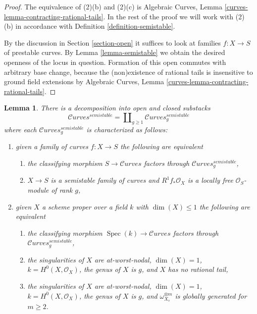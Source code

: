 \documentclass{stacks-project}
\theoremstyle{plain}
\newtheorem{lemma}[subsection]{Lemma}
\theoremstyle{definition}
\theoremstyle{remark}
\numberwithin{equation}{subsection}
\def\Spec{\mathop{\mathrm{Spec}}}
\def\Curvesstack{\mathcal{C}\!\mathit{urves}}
\begin{document}
\begin{proof}
The equivalence of (2)(b) and (2)(c) is
Algebraic Curves, Lemma \ref{curves-lemma-contracting-rational-tails}.
In the rest of the proof we will work with (2)(b)
in accordance with Definition \ref{definition-semistable}.

\medskip\noindent
By the discussion in Section \ref{section-open}
it suffices to look at families $f : X \to S$ of
prestable curves. By Lemma \ref{lemma-semistable}
we obtain the desired openness of the locus in question.
Formation of this open commutes with arbitrary base change,
because the (non)existence of rational tails is insensitive
to ground field extensions by
Algebraic Curves, Lemma \ref{curves-lemma-contracting-rational-tails}.
\end{proof}

\begin{lemma}
\label{lemma-semistable-one-piece-per-genus}
There is a decomposition into open and closed substacks
$$
\Curvesstack^{semistable} = \coprod\nolimits_{g \geq 1}
\Curvesstack^{semistable}_g
$$
where each $\Curvesstack^{semistable}_g$ is characterized as follows:
\begin{enumerate}
\item given a family of curves $f : X \to S$ the following are equivalent
\begin{enumerate}
\item the classifying morphism $S \to \Curvesstack$ factors
through $\Curvesstack^{semistable}_g$,
\item $X \to S$ is a semistable family of curves and
$R^1f_*\mathcal{O}_X$ is a locally free $\mathcal{O}_S$-module of rank $g$,
\end{enumerate}
\item given $X$ a scheme proper over a field $k$ with
$\dim(X) \leq 1$ the following are equivalent
\begin{enumerate}
\item the classifying morphism $\Spec(k) \to \Curvesstack$
factors through $\Curvesstack^{semistable}_g$,
\item the singularities of $X$ are at-worst-nodal, $\dim(X) = 1$,
$k = H^0(X, \mathcal{O}_X)$, the genus of $X$ is $g$, and $X$
has no rational tail,
\item the singularities of $X$ are at-worst-nodal, $\dim(X) = 1$,
$k = H^0(X, \mathcal{O}_X)$, the genus of $X$ is $g$, and
$\omega_{X_s}^{\otimes m}$ is globally generated for $m \geq 2$.
\end{enumerate}
\end{enumerate}
\end{lemma}
\end{document}
